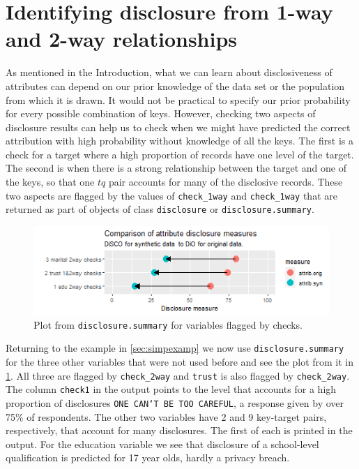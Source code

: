 \documentclass[12pt]{article}
\begin{document}
 \section{Identifying disclosure from 1-way and 2-way relationships}\label{sec:onetwoway}
As mentioned in the Introduction, what we can learn about disclosiveness of attributes can depend on our prior knowledge of the data set or the population from which it is drawn. It would not be practical to specify our prior probability for every possible combination of keys. However, checking two aspects
of disclosure results can help us to check when we might have predicted the correct attribution with high probability without knowledge of all the keys.
The first is a check for a target where a high proportion of records have one level of the target. The second is when there is a strong relationship
between the target and one of the keys, so that one $tq$ pair accounts for many of the disclosive records. These two aspects are flagged by the
values of  \texttt{check\_1way} and \texttt{check\_1way} that are returned as part of objects of class \texttt{disclosure} or \texttt{disclosure.summary}.
\begin{figure}[h]
    \centering
    \includegraphics[width=1\linewidth]{fig2dis.png}
    \caption{Plot from \texttt{disclosure.summary} for variables flagged by checks.}
    \label{fig:f2}
\end{figure}
Returning to the example in \ref{sec:simpexamp} we now use  \texttt{disclosure.summary} for the three other variables that were not used before and 
see the plot from it in \ref{fig:f2}. All three are flagged by \texttt{check\_2way} and \texttt{trust} is also flagged by \texttt{check\_2way}. The column \texttt{check1} in the output points to the level that accounts for a high proportion of disclosures \texttt{ONE CAN`T BE TOO CAREFUL}, a response given by over 75\% of respondents. The other two variables have 2 and 9 key-target pairs, respectively, that account for many disclosures. The first of each is printed in the output. For the education variable  we see that disclosure of a school-level qualification is predicted for 17 year olds, hardly a privacy breach.
\end{document}

